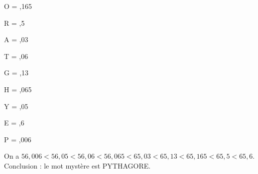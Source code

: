    \begin{colitemize}{2}
      \item O = ,165
      \item R = ,5
      \item A = ,03
      \item T = ,06
      \item G = ,13
      \item H = ,065
      \item Y = ,05
      \item E = ,6
      \item P = ,006
   \end{colitemize}
   On a {\blue $56,006 < 56,05 < 56,06 < 56,065 < 65,03 < 65,13 < 65,165 < 65,5 < 65,6$}. \\
   Conclusion : le mot mystère est \blue PYTHAGORE. \\
